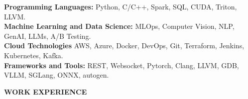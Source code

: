 \documentclass[10pt,a4]{article}
\def\hrulefill{\leavevmode\leaders\hrule height 1pt\hfill\kern0pt}		%
\begin{document}
{\begin{flushleft}
            \hspace{0.5cm}  \textbf{Programming Languages:} Python, C/C++, Spark, SQL, CUDA, Triton, LLVM. \\
            \hspace{0.5cm}  \textbf{Machine Learning and Data Science:} MLOps, Computer Vision, NLP, GenAI, LLMs, A/B Testing. \\
            \hspace{0.5cm}  \textbf{Cloud Technologies} AWS, Azure, Docker, DevOps, Git, Terraform, Jenkins, Kubernetes, Kafka. \\
            \hspace{0.5cm}  \textbf{Frameworks and Tools:} REST, Websocket, Pytorch, Clang, LLVM, GDB, VLLM, SGLang, ONNX, autogen. \\

        

\end{flushleft}
		
		
\begin{flushleft}
    {\Large \textbf{WORK EXPERIENCE}} %


\end{flushleft}}
\end{document}
